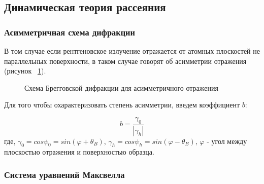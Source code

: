 \subsection{Динамическая теория рассеяния}
  \subsubsection{Асимметричная схема дифракции}
  В том случае если рентгеновское излучение отражается от атомных плоскостей не
   параллельных поверхности, в таком случае говорят об асимметрии отражения (рисунок ~\ref{ris:assymetric_brag}).

  \begin{figure}[h]
    \centering
    \hfill
    \caption{Схема Брегговской дифракции для асимметричного отражения}
    \label{ris:assymetric_brag}
  \end{figure}

  Для того чтобы охарактеризовать степень асимметрии, введем коэффициент $b$:

  \begin{equation}
    b = \frac {\gamma_0}{|\gamma_h|}
   \end{equation}
где, $\gamma_0 = cos \psi_0 = sin ( \varphi + \theta_B)$, $\gamma_h = cos \psi_h = sin ( \varphi - \theta_B)$,
 $\varphi$ - угол между плоскостью отражения и поверхностью образца.
 \subsubsection{Система уравнений Максвелла}
